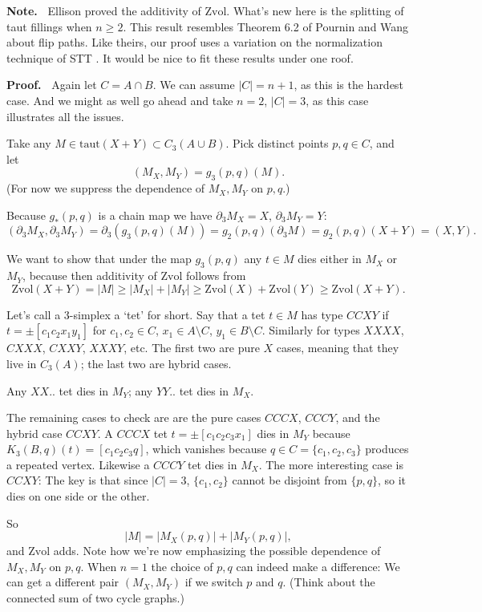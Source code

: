 \documentclass[12pt]{article}
\newcommand{\proofstart}{{\noindent \bf Proof.\ }}
\newcommand{\note}{{\noindent \bf Note.\ }}
\def\del{\partial}
\newcommand{\union}{\cup}
\newcommand{\kw}{\mathrm}
\newcommand{\taut}{\kw{taut}}
\newcommand{\Zvol}{\kw{Zvol}}
\begin{document}
\note
Ellison \cite{ellison:gap}
proved the additivity of $\Zvol$.
What's new here is the splitting of taut fillings when $n\geq 2$.
This result resembles Theorem 6.2 of
Pournin and Wang
\cite{pw:flip}
about flip paths.
Like theirs, our proof uses a variation on the normalization technique
of STT
\cite[Lemma 7]{stt:jams}.
It would be nice to fit these results under one roof.
\medskip

\proofstart
Again let $C = A \cap B$.
We can assume $|C| = n+1$,
as this is the hardest case.
And we might as well go ahead and take $n=2$, $|C|=3$,
as this case illustrates all the issues.

Take any $M \in \taut(X+Y) \subset C_3(A \union B)$.
Pick distinct points $p,q \in C$,
and let
\[
(M_X,M_Y) = g_{3}(p,q)(M)
.
\]
(For now we suppress the dependence of $M_X,M_Y$ on $p,q$.)

Because $g_*(p,q)$ is a chain map we have
$\del_{3} M_X = X$, $\del_{3} M_Y = Y$:
\[
(\del_{3} M_X, \del_{3} M_Y)
=
\del_{3} (g_{3}(p,q)(M))
=
g_2(p, q)(\del_{3} M)
=
g_2(p,q)(X+Y)
=
(X,Y)
.
\]

We want to show that under the map $g_3(p,q)$ any $t \in M$
dies either in $M_X$ or $M_Y$,
because then additivity of $\Zvol$ follows from
\[
\Zvol(X+Y) = |M|
\geq |M_X| + |M_Y|
\geq \Zvol(X) + \Zvol(Y)
\geq \Zvol(X+Y)
.
\]

Let's call a $3$-simplex a `tet' for short.
Say that a tet $t \in M$ has type $CCXY$ if $t= \pm[c_1c_2x_1y_1]$
for $c_1,c_2 \in C$, $x_1 \in A \setminus C$, $y_1 \in B \setminus C$.
Similarly for types $XXXX$, $CXXX$, $CXXY$, $XXXY$, etc.
The first two are pure $X$ cases, meaning that they live in $C_3(A)$;
the last two are hybrid cases.

Any $XX..$ tet dies in $M_Y$;
any $YY..$ tet dies in $M_X$.

The remaining cases to check are
are the pure cases $CCCX$, $CCCY$,
and the hybrid case $CCXY$.
A $CCCX$ tet $t=\pm[c_1c_2c_3x_1]$ dies in $M_Y$ because
$K_3(B,q)(t)=[c_1c_2c_3q]$,
which vanishes because $q \in C = \{c_1,c_2,c_3\}$ produces a repeated vertex.
Likewise a $CCCY$ tet dies in $M_X$.
The more interesting case is $CCXY$:
The key is that since $|C|=3$, $\{c_1,c_2\}$ cannot be disjoint from $\{p,q\}$,
so it dies on one side or the other.

So 
\[
|M| = |M_X(p,q)| + |M_Y(p,q)|,
\]
and $\Zvol$ adds.
Note how we're now emphasizing the possible dependence of $M_X,M_Y$ on $p,q$.
When $n=1$ the choice of $p,q$ can indeed make a difference:
We can get a different pair $(M_X,M_Y)$ if we switch
$p$ and $q$.
(Think about the connected sum of two cycle graphs.)
\end{document}
